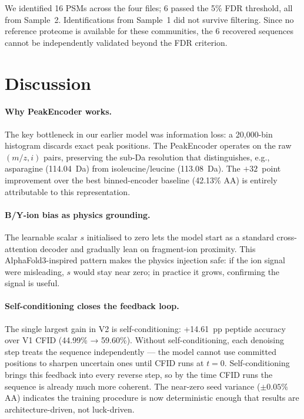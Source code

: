 \documentclass[11pt]{article}
\begin{document}
We identified 16 PSMs across the four files; 6 passed the 5\% FDR threshold,
all from Sample~2. Identifications from Sample~1 did not survive filtering. Since no
reference proteome is available for these communities, the 6 recovered sequences
cannot be independently validated beyond the FDR criterion.

\section{Discussion}

\paragraph{Why PeakEncoder works.}
The key bottleneck in our earlier model was information loss: a 20,000-bin histogram
discards exact peak positions. The PeakEncoder operates on the raw $(m/z, i)$ pairs,
preserving the sub-Da resolution that distinguishes, e.g., asparagine (114.04~Da)
from isoleucine/leucine (113.08~Da). The $+32$~point improvement over the best
binned-encoder baseline (42.13\% AA) is entirely attributable to this representation.

\paragraph{B/Y-ion bias as physics grounding.}
The learnable scalar $s$ initialised to zero lets the model start as a standard
cross-attention decoder and gradually lean on fragment-ion proximity. This
AlphaFold3-inspired pattern makes the physics injection safe: if the ion signal
were misleading, $s$ would stay near zero; in practice it grows, confirming the
signal is useful.

\paragraph{Self-conditioning closes the feedback loop.}
The single largest gain in V2 is self-conditioning: +14.61~pp peptide accuracy over
V1 CFID (44.99\% → 59.60\%). Without self-conditioning, each denoising step treats
the sequence independently --- the model cannot use committed positions to sharpen
uncertain ones until CFID runs at $t=0$. Self-conditioning brings this feedback into
every reverse step, so by the time CFID runs the sequence is already much more
coherent. The near-zero seed variance ($\pm0.05\%$ AA) indicates the training
procedure is now deterministic enough that results are architecture-driven, not
luck-driven.
\end{document}
